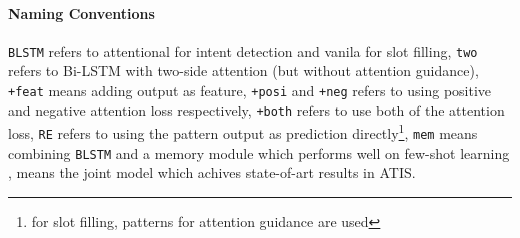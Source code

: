 \paragraph{Naming Conventions}
\texttt{BLSTM} refers to attentional \BLSTM for intent detection and vanila \BLSTM for slot filling, \texttt{two} refers to Bi-LSTM with two-side attention (but without attention guidance), \texttt{+feat} means adding \RE output as feature, \texttt{+posi} and \texttt{+neg} refers to using positive and negative attention loss respectively, \texttt{+both} refers to use both of the attention loss, \texttt{RE} refers to using the \RE pattern output as prediction directly\footnote{for slot filling, patterns for attention guidance are used}, \texttt{mem} means combining \texttt{BLSTM} and a memory module which performs well on few-shot learning \cite{kaiser2017learning}, \LL means the joint model \cite{liu2016attention} which achives state-of-art results in ATIS. 



